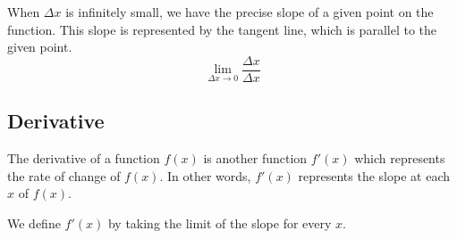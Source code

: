 \documentclass{article}
\begin{document}
\begin{minipage}{0.5\textwidth}
    When \(\Delta x\) is infinitely small, we have the precise slope of a given point
    on the function. This slope is represented by the tangent line, which is parallel to the given point.
    \[
        \lim_{\Delta x \to 0} \frac{\Delta x}{\Delta x}
    \]
\end{minipage}
\begin{minipage}{0.5\textwidth}
\end{minipage}

\subsection{Derivative}

The derivative of a function \(f(x)\) is another function \(f'(x)\) which
represents the rate of change of \(f(x)\). In other words, \(f'(x)\)
represents the slope at each \(x\) of \(f(x)\).

We define \(f'(x)\) by taking the limit of the slope for every \(x\).
\end{document}
